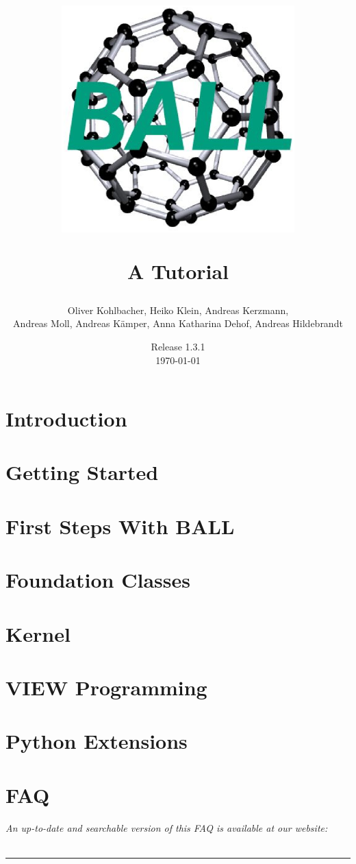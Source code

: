 \documentclass[12pt,twoside]{report}
\author{
  Oliver Kohlbacher, Heiko Klein, Andreas Kerzmann, \\
  Andreas Moll, Andreas K\"{a}mper, Anna Katharina Dehof, Andreas Hildebrandt
}
\title{
  \begin{center}
    \includegraphics[width=9cm]{logo.eps}
  \end{center}
  \vspace{1cm}
  \Large A Tutorial
}
\date{
  Release 1.3.1\\
  \today
}
\begin{document}
\setlength{\headheight}{14.5pt}
\setcounter{page}{1}
\maketitle
\cleardoublepage

\tableofcontents
\clearpage

\setcounter{page}{1}


\chapter{Introduction}
\label{chapter:introduction}



\chapter{Getting Started}
\label{chapter:getting-started}




\chapter{First Steps With BALL}
\label{chapter:first-steps}




\chapter{Foundation Classes}
\label{chapter:foundation-classes}




\chapter{Kernel}
\label{chapter:kernel}


\chapter{VIEW Programming}
\label{chapter:view-programming}


\chapter{Python Extensions}
\label{chapter:python}


\chapter{FAQ}
\label{chapter:faq}
\newpage
\noindent
{\it An up-to-date and searchable version of this FAQ is available at our 
website:\\
}\\
\hspace{1mm}
\rule{\textwidth}{0.1pt}
\hspace{3mm}

\end{document}
